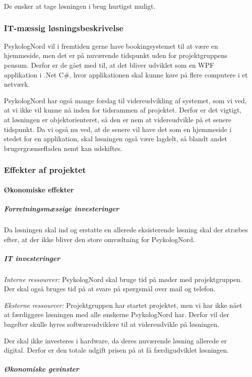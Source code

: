 De ønsker at tage løsningen i brug hurtigst muligt.

\subsubsection{IT-mæssig løsningsbeskrivelse}

PsykologNord vil i fremtiden gerne have bookingsystemet til at være en hjemmeside, men det er på nuværende tidspunkt uden for projektgruppens pensum.
Derfor er de gået med til, at det bliver udviklet som en WPF applikation i .Net C\#, hvor applikationen skal kunne køre på flere computere i et netværk.

PsykologNord har også mange forslag til videreudvikling af systemet, som vi ved, at vi ikke vil kunne nå inden for tidsrammen af projektet.
Derfor er det vigtigt, at løsningen er objektorienteret, så den er nem at videreudvikle på et senere tidspunkt.
Da vi også nu ved, at de senere vil have det som en hjemmeside i stedet for en applikation, skal løsningen også være lagdelt, så blandt andet brugergrænsefladen nemt kan udskiftes.

\subsubsection{Effekter af projektet}
\paragraph*{Økonomiske effekter}
\subparagraph*{Forretningsmæssige investeringer}

Da løsningen skal ind og erstatte en allerede eksisterende løsning skal der stræbes efter, at der ikke bliver den store omvæltning for PsykologNord.

\subparagraph{IT investeringer}

\textit{Interne ressourcer:} PsykologNord skal bruge tid på møder med projektgruppen. Der skal også bruges tid på at svare på spørgsmål over mail og telefon.

\textit{Eksterne ressourcer:} Projektgruppen har startet projektet, men vi har ikke nået at færdiggøre løsningen med alle ønskerne PsykologNord har.
Derfor vil der bagefter skulle hyres softwareudviklere til at videreudvikle på løsningen.

Der skal ikke investeres i hardware, da deres nuværende løsning allerede er digital. Derfor er den totale udgift prisen på at få færdigudviklet løsningen.

\subparagraph{Økonomiske gevinster}

